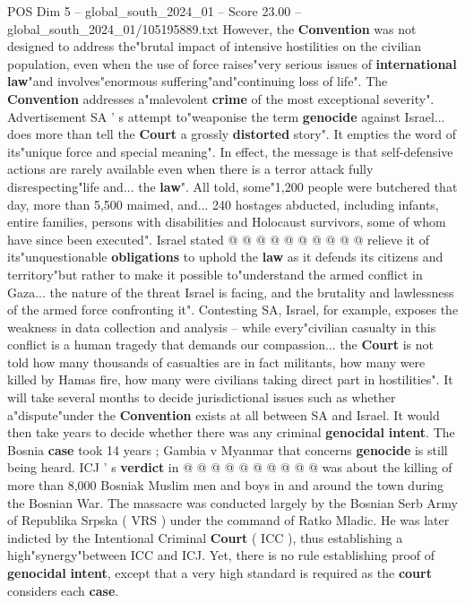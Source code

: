 \begin{textsample}{POS Dim 5 – global\_south\_2024\_01 – Score 23.00 – global\_south\_2024\_01/105195889.txt}
However, the \textbf{Convention} was not designed to address the"brutal impact of intensive hostilities on the civilian population, even when the use of force raises"very serious issues of \textbf{international} \textbf{law}"and involves"enormous suffering"and"continuing loss of life".
The \textbf{Convention} addresses a"malevolent \textbf{crime} of the most exceptional severity".
Advertisement SA ' s attempt to"weaponise the term \textbf{genocide} against Israel... does more than tell the \textbf{Court} a grossly \textbf{distorted} story".
It empties the word of its"unique force and special meaning".
In effect, the message is that self-defensive actions are rarely available even when there is a terror attack fully disrespecting"life and... the \textbf{law}".
All told, some"1,200 people were butchered that day, more than 5,500 maimed, and... 240 hostages abducted, including infants, entire families, persons with disabilities and Holocaust survivors, some of whom have since been executed".
Israel stated @ @ @ @ @ @ @ @ @ @ relieve it of its"unquestionable \textbf{obligations} to uphold the \textbf{law} as it defends its citizens and territory"but rather to make it possible to"understand the armed conflict in Gaza... the nature of the threat Israel is facing, and the brutality and lawlessness of the armed force confronting it".
Contesting SA, Israel, for example, exposes the weakness in data collection and analysis -- while every"civilian casualty in this conflict is a human tragedy that demands our compassion... the \textbf{Court} is not told how many thousands of casualties are in fact militants, how many were killed by Hamas fire, how many were civilians taking direct part in hostilities".
It will take several months to decide jurisdictional issues such as whether a"dispute"under the \textbf{Convention} exists at all between SA and Israel.
It would then take years to decide whether there was any criminal \textbf{genocidal} \textbf{intent}.
The Bosnia \textbf{case} took 14 years ; Gambia v Myanmar that concerns \textbf{genocide} is still being heard.
ICJ ' s \textbf{verdict} in @ @ @ @ @ @ @ @ @ @ was about the killing of more than 8,000 Bosniak Muslim men and boys in and around the town during the Bosnian War.
The massacre was conducted largely by the Bosnian Serb Army of Republika Srpska ( VRS ) under the command of Ratko Mladic.
He was later indicted by the Intentional Criminal \textbf{Court} ( ICC ), thus establishing a high"synergy"between ICC and ICJ.
Yet, there is no rule establishing proof of \textbf{genocidal} \textbf{intent}, except that a very high standard is required as the \textbf{court} considers each \textbf{case}.

\end{textsample}
